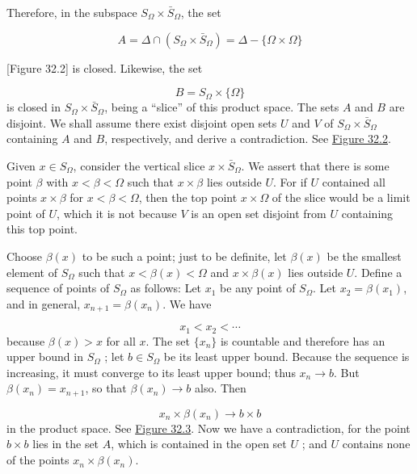 Therefore, in the subspace \(S_{\Omega } \times {\bar{S}}_{\Omega }\), the set

\[
A = \Delta \cap ( {S_{\Omega } \times {\bar{S}}_{\Omega }}) = \Delta - \{ \Omega \times \Omega \}
\]

[Figure 32.2]
is closed. Likewise, the set

\[
B = S_{\Omega } \times \{ \Omega \}
\]
is closed in \(S_{\Omega } \times {\bar{S}}_{\Omega }\), being a ``slice'' of this product space. The sets \(A\) and \(B\) are disjoint. We shall assume there exist disjoint open sets \(U\) and \(V\) of \(S_{\Omega } \times {\bar{S}}_{\Omega }\) containing \(A\) and \(B\), respectively, and derive a contradiction. See \hyperref[fig:32.2]{Figure 32.2}.

Given \(x \in {S}_{\Omega }\), consider the vertical slice \(x \times {\bar{S}}_{\Omega }\). We assert that there is some point \(\beta\) with \(x < \beta < \Omega\) such that \(x \times \beta\) lies outside \(U\). For if \(U\) contained all points \(x \times \beta\) for \(x < \beta < \Omega\), then the top point \(x \times \Omega\) of the slice would be a limit point of \(U\), which it is not because \(V\) is an open set disjoint from \(U\) containing this top point.

Choose \(\beta (x)\) to be such a point; just to be definite, let \(\beta (x)\) be the smallest element of \(S_{\Omega }\) such that \(x < \beta (x) < \Omega\) and \(x \times \beta (x)\) lies outside \(U\). Define a sequence of points of \(S_{\Omega }\) as follows: Let \(x_{1}\) be any point of \(S_{\Omega }\). Let \(x_{2} = \beta ( x_{1})\), and in general, \(x_{n + 1} = \beta ( x_{n})\). We have

\[
x_{1} < x_{2} < \cdots
\]
because \(\beta (x) > x\) for all \(x\). The set \(\{ x_{n}\}\) is countable and therefore has an upper bound in \(S_{\Omega }\) ; let \(b \in {S}_{\Omega }\) be its least upper bound. Because the sequence is increasing, it must converge to its least upper bound; thus \(x_{n} \rightarrow b\). But \(\beta ( x_{n}) = x_{n + 1}\), so that \(\beta ( x_{n}) \rightarrow b\) also. Then

\[
x_{n} \times \beta ( x_{n}) \rightarrow b \times b
\]
in the product space. See \hyperref[fig:32.3]{Figure 32.3}. Now we have a contradiction, for the point \(b \times b\) lies in the set \(A\), which is contained in the open set \(U\) ; and \(U\) contains none of the points \(x_{n} \times \beta ( x_{n})\).

